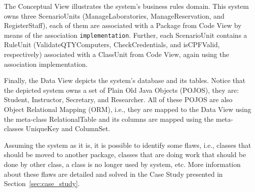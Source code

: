 The Conceptual View illustrates the system's  business rules domain. This system owns three ScenarioUnits (ManageLaboratories, ManageReservation, and RegisterStaff), each of them are associated with a Package from Code View by means of the association \texttt{implementation}. Further, each ScenarioUnit contains a RuleUnit (ValidateQTYComputers, CheckCredentials, and isCPFValid, respectively) associated with a ClassUnit from Code View, again using the association implementation.

Finally, the Data View depicts the system's database and its tables. Notice that the depicted system owns a set of Plain Old Java Objects (POJOS), they are: Student, Instructor, Secretary, and Researcher. All of these POJOS are also Object Relational Mapping (ORM), i.e., they are mapped to the Data View using the meta-class RelationalTable and its columns are mapped using the meta-classes UniqueKey and ColumnSet.

Assuming the system as it is, it is possible to identify some flaws, i.e., classes that should be moved to another package, classes that are doing work that should be done by other class, a class is no longer used by system, etc. More information about these flaws are detailed and solved in the Case Study presented in Section~\ref{sec:case_study}.




